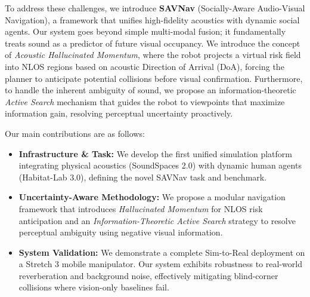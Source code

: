 To address these challenges, we introduce \textbf{SAVNav} (Socially-Aware Audio-Visual Navigation), a framework that unifies high-fidelity acoustics with dynamic social agents. Our system goes beyond simple multi-modal fusion; it fundamentally treats sound as a predictor of future visual occupancy. We introduce the concept of \textit{Acoustic Hallucinated Momentum}, where the robot projects a virtual risk field into NLOS regions based on acoustic Direction of Arrival (DoA), forcing the planner to anticipate potential collisions before visual confirmation. Furthermore, to handle the inherent ambiguity of sound, we propose an information-theoretic \textit{Active Search} mechanism that guides the robot to viewpoints that maximize information gain, resolving perceptual uncertainty proactively.

Our main contributions are as follows:
\begin{itemize}
  \item \textbf{Infrastructure \& Task:} We develop the first unified simulation platform integrating physical acoustics (SoundSpaces 2.0) with dynamic human agents (Habitat-Lab 3.0), defining the novel SAVNav task and benchmark.
  \item \textbf{Uncertainty-Aware Methodology:} We propose a modular navigation framework that introduces \textit{Hallucinated Momentum} for NLOS risk anticipation and an \textit{Information-Theoretic Active Search} strategy to resolve perceptual ambiguity using negative visual information.
  \item \textbf{System Validation:} We demonstrate a complete Sim-to-Real deployment on a Stretch 3 mobile manipulator. Our system exhibits robustness to real-world reverberation and background noise, effectively mitigating blind-corner collisions where vision-only baselines fail.
\end{itemize}
